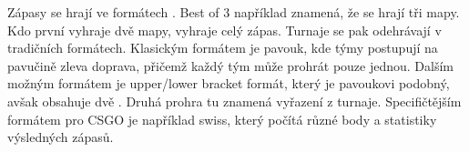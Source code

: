 Zápasy se hrají ve formátech . Best of 3 například znamená, že se hrají tři mapy. Kdo první vyhraje dvě mapy, vyhraje celý zápas. Turnaje se pak odehrávají v
tradičních formátech. Klasickým formátem je pavouk, kde týmy postupují na pavučině zleva doprava, přičemž každý tým může prohrát pouze jednou. Dalším možným formátem je
upper/lower bracket formát, který je pavoukovi podobný, avšak obsahuje dvě . Druhá prohra tu znamená vyřazení z turnaje. Specifičtějším formátem pro \ac{CSGO}
je například swiss, který počítá různé body a statistiky výsledných zápasů.